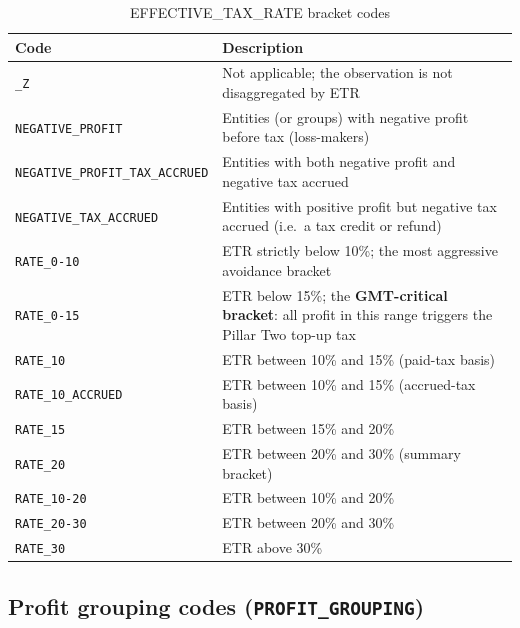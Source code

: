 \documentclass[11pt,a4paper]{article}
\newcommand{\code}[1]{\texttt{#1}}
\begin{document}
\begin{table}[H]
\centering
\caption{EFFECTIVE\_TAX\_RATE bracket codes}
\label{tab:etr}
\begin{tabular}{@{}lp{11cm}@{}}
\toprule
Code & Description \\
\midrule
\code{\_Z}                         & Not applicable; the observation is not disaggregated by ETR \\
\code{NEGATIVE\_PROFIT}            & Entities (or groups) with negative profit before tax (loss-makers) \\
\code{NEGATIVE\_PROFIT\_TAX\_ACCRUED} & Entities with both negative profit and negative tax accrued \\
\code{NEGATIVE\_TAX\_ACCRUED}      & Entities with positive profit but negative tax accrued (i.e.\ a tax credit or refund) \\
\code{RATE\_0-10}                  & ETR strictly below 10\%; the most aggressive avoidance bracket \\
\code{RATE\_0-15}                  & ETR below 15\%; the \textbf{GMT-critical bracket}: all profit in this range triggers the Pillar Two top-up tax \\
\code{RATE\_10}                    & ETR between 10\% and 15\% (paid-tax basis) \\
\code{RATE\_10\_ACCRUED}           & ETR between 10\% and 15\% (accrued-tax basis) \\
\code{RATE\_15}                    & ETR between 15\% and 20\% \\
\code{RATE\_20}                    & ETR between 20\% and 30\% (summary bracket) \\
\code{RATE\_10-20}                 & ETR between 10\% and 20\% \\
\code{RATE\_20-30}                 & ETR between 20\% and 30\% \\
\code{RATE\_30}                    & ETR above 30\% \\
\bottomrule
\end{tabular}
\end{table}

\subsection{Profit grouping codes (\texttt{PROFIT\_GROUPING})}
\end{document}
